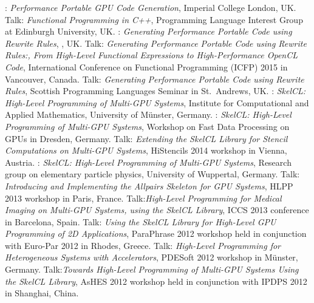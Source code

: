          {: \emph{Performance Portable GPU Code Generation},
         \small Imperial College London, UK.}
         {Talk: \emph{Functional Programming in C++},
         \small Programming Language Interest Group at Edinburgh University, UK.}
         {: \emph{Generating Performance Portable Code using Rewrite Rules},
         \small {}, UK.}
         {Talk: \emph{Generating Performance Portable Code using Rewrite Rules:, From High-Level Functional Expressions to High-Performance OpenCL Code},
         \small International Conference on Functional Programming (ICFP) 2015 in Vancouver, Canada.}
         {Talk: \emph{Generating Performance Portable Code using Rewrite Rules},
         \small Scottish Programming Languages Seminar in St.\ Andrews, UK.}
         {: \emph{SkelCL\@: High-Level Programming of Multi-GPU
          Systems}, \small Institute for Computational and Applied
          Mathematics, University of Münster, Germany.}
         {: \emph{SkelCL\@: High-Level Programming of Multi-GPU
          Systems}, \small Workshop on Fast Data Processing on GPUs in
          Dresden, Germany.}
         {Talk: \emph{Extending the SkelCL Library for Stencil
          Computations on Multi-GPU Systems}, \small HiStencils 2014
          workshop in Vienna, Austria.}
         {: \emph{SkelCL\@: High-Level Programming of Multi-GPU
          Systems}, \small Research group on elementary particle physics,
          University of Wuppertal, Germany.}
         {Talk: \emph{Introducing and Implementing the Allpairs Skeleton for GPU
          Systems}, \small HLPP 2013 workshop in Paris, France.}
         {Talk:\emph{High-Level Programming for Medical Imaging on Multi-GPU
          Systems, using the SkelCL Library}, \small ICCS 2013 conference in
          Barcelona, Spain.}
       {Talk: \emph{Using the SkelCL Library for High-Level GPU Programming of
        2D Applications}, \small ParaPhrase 2012 workshop held in
        conjunction with Euro-Par 2012 in Rhodes, Greece.}
       {Talk: \emph{High-Level Programming for Heterogeneous Systems with
        Accelerators}, \small PDESoft 2012 workshop in Münster, Germany.}
       {Talk:\emph{Towards High-Level Programming of Multi-GPU Systems Using
        the SkelCL Library}, \small AsHES 2012 workshop held in
        conjunction with IPDPS 2012 in Shanghai, China.}
